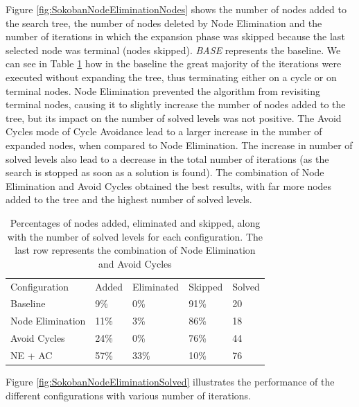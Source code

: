 \medskip\noindent
Figure \ref{fig:SokobanNodeEliminationNodes} shows the number of nodes added to the search tree, the number of nodes deleted by Node Elimination and the number of iterations in which the expansion phase was skipped because the last selected node was terminal (nodes skipped). \textit{BASE} represents the baseline. We can see in Table \ref{tab:SokobanNodeEliminationNodes} how in the baseline the great majority of the iterations were executed without expanding the tree, thus terminating either on a cycle or on terminal nodes. Node Elimination prevented the algorithm from revisiting terminal nodes, causing it to slightly increase the number of nodes added to the tree, but its impact on the number of solved levels was not positive. The Avoid Cycles mode of Cycle Avoidance lead to a larger increase in the number of expanded nodes, when compared to Node Elimination. The increase in number of solved levels also lead to a decrease in the total number of iterations (as the search is stopped as soon as a solution is found). The combination of Node Elimination and Avoid Cycles obtained the best results, with far more nodes added to the tree and the highest number of solved levels.

\begin{table}[!h]
    \centering
    \begin{tabular}{l|l|l|l|l}
        Configuration & Added & Eliminated & Skipped & Solved\\
        Baseline & 9\% & 0\% & 91\% & 20\\
        Node Elimination & 11\% & 3\% & 86\% & 18\\
        Avoid Cycles & 24\% & 0\% & 76\% & 44\\
        NE + AC & 57\% & 33\%  & 10\% & 76
    \end{tabular}
    \caption[Node Elimination and Avoid Cycles evaluation]{Percentages of nodes added, eliminated and skipped, along with the number of solved levels for each configuration. The last row represents the combination of Node Elimination and Avoid Cycles}
    \label{tab:SokobanNodeEliminationNodes}
\end{table}

\medskip\noindent
Figure \ref{fig:SokobanNodeEliminationSolved} illustrates the performance of the different configurations with various number of iterations.

